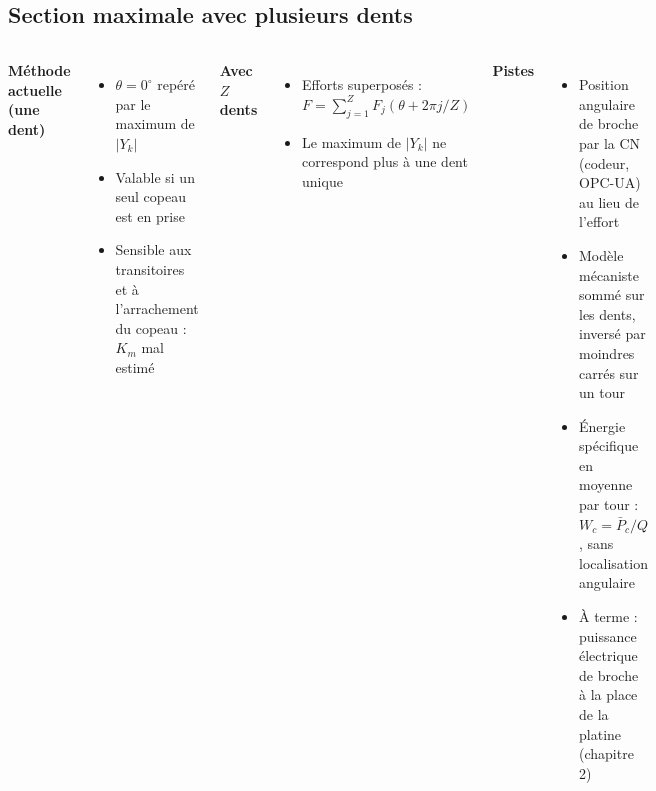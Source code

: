 \subsection*{Section maximale avec plusieurs dents}
\begin{frame}

    \begin{columns}[t]
        \textbf{Méthode actuelle (une dent)}
        \begin{itemize}
            \item $\theta = 0^\circ$ repéré par le maximum de $|Y_k|$
            \item Valable si un seul copeau est en prise
            \item Sensible aux transitoires et à l'arrachement du copeau : $K_m$ mal estimé
        \end{itemize}
        \textbf{Avec $Z$ dents}
        \begin{itemize}
            \item Efforts \alert{superposés} : $F = \sum_{j=1}^{Z} F_j(\theta + 2\pi j/Z)$
            \item Le maximum de $|Y_k|$ ne correspond plus à une dent unique
        \end{itemize}
        \textbf{Pistes}
        \begin{itemize}
            \item Position angulaire de broche par la \alert{CN} (codeur, OPC-UA) au lieu de l'effort
            \item Modèle mécaniste sommé sur les dents, inversé par moindres carrés sur un tour
            \item Énergie spécifique en \alert{moyenne par tour} : $W_c = \bar{P}_c / Q$, sans localisation angulaire
            \item À terme : puissance électrique de broche à la place de la platine (chapitre 2)
        \end{itemize}
    \end{columns}
\end{frame}

